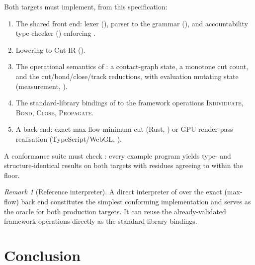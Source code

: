 \documentclass[11pt,a4paper]{article}
\theoremstyle{thmstyle}
\theoremstyle{definition}
\theoremstyle{remark}
\newtheorem{remark}[theorem]{Remark}
\begin{document}
Both targets must implement, from this specification:

\begin{enumerate}[leftmargin=1.6em,itemsep=2pt]
\item The shared front end: lexer (), parser to the
grammar (), and accountability type checker
() enforcing .
\item Lowering to Cut-IR ().
\item The operational semantics of : a contact-graph
state, a monotone cut count, and the cut/bond/close/track reductions, with
evaluation mutating state (measurement, ).
\item The standard-library bindings of  to the framework
operations \textsc{Individuate}, \textsc{Bond}, \textsc{Close},
\textsc{Propagate}.
\item A back end: exact max-flow minimum cut (Rust,
) or GPU render-pass realisation (TypeScript/WebGL,
).
\end{enumerate}

A conformance suite must check : every example
program yields type- and structure-identical results on both targets with
residues agreeing to within the floor.

\begin{remark}[Reference interpreter]
\label{rem:reference}
A direct interpreter of  over the exact (max-flow) back
end constitutes the simplest conforming implementation and serves as the
oracle for both production targets. It can reuse the already-validated
framework operations directly as the standard-library bindings.
\end{remark}

\section{Conclusion}
\label{sec:conclusion}
\end{document}

